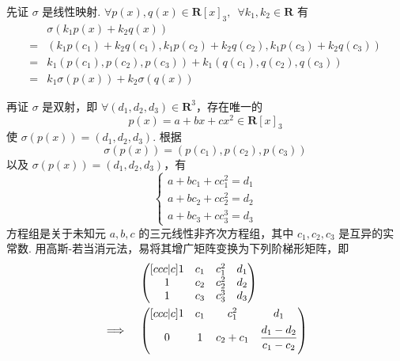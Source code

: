 \begin{exercise}
\begin{exgroup}
\begin{answer}
          先证 $ \sigma $ 是线性映射. $ \forall p(x), q(x) \in \mathbf{R}[x]_3,\enspace \forall k_1, k_2 \in \mathbf{R} $ 有
          \begin{align*}
                  & \sigma(k_1 p(x) + k_2 q(x))                                                 \\
              ={} & (k_1 p(c_1) + k_2 q(c_1), k_1 p(c_2) + k_2 q(c_2), k_1 p(c_3) + k_2 q(c_3)) \\
              ={} & k_1(p(c_1), p(c_2), p(c_3)) + k_1(q(c_1), q(c_2), q(c_3))                   \\
              ={} & k_1 \sigma(p(x)) + k_2 \sigma(q(x))
          \end{align*}

          再证 $ \sigma $ 是双射，即 $ \forall (d_1, d_2, d_3) \in \mathbf{R}^3 $，存在唯一的
          \[ p(x) = a + bx + cx^2 \in \mathbf{R}[x]_3 \]
          使 $ \sigma(p(x)) = (d_1, d_2, d_3) $. 根据
          \[ \sigma(p(x)) = (p(c_1), p(c_2), p(c_3)) \]
          以及 $ \sigma(p(x)) = (d_1, d_2, d_3) $，有
          \[ \begin{cases}
                  a + bc_1 + cc_1^2 = d_1 \\
                  a + bc_2 + cc_2^2 = d_2 \\
                  a + bc_3 + cc_3^3 = d_3
              \end{cases} \]
          方程组是关于未知元 $ a, b, c $ 的三元线性非齐次方程组，其中 $ c_1, c_2, c_3 $ 是互异的实常数. 用高斯-若当消元法，易将其增广矩阵变换为下列阶梯形矩阵，即
          \begin{align}
                             & \begin{pmatrix}[ccc|c]
                                   1 & c_1 & c_1^2 & d_1 \\
                                   1 & c_2 & c_2^2 & d_2 \\
                                   1 & c_3 & c_3^3 & d_3
                               \end{pmatrix} \notag                                                                    \\
              \implies \quad & \begin{pmatrix}[ccc|c]
                                   1 & c_1 & c_1^2     & d_1                                                         \\[1ex]
                                   0 & 1   & c_2 + c_1 & \dfrac{d_1 - d_2}{c_1 - c_2}                                \\[2ex]

\end{pmatrix}
\end{align}
\end{answer}
\end{exgroup}
\end{exercise}
